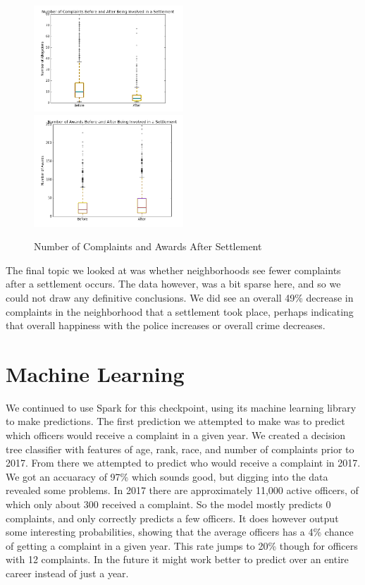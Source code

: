 \documentclass[11pt]{article}
\begin{document}
\begin{figure}[h!]
\caption{Number of Complaints and Awards After Settlement}
\includegraphics[width=0.5\textwidth]{settb.png}
\includegraphics[width=0.5\textwidth]{awards.png}
\end{figure}

The final topic we looked at was whether neighborhoods see fewer complaints after a settlement occurs. The data however, was a bit sparse here, and so we could not draw any definitive conclusions. We did see an overall 49\% decrease in complaints in the neighborhood that a settlement took place, perhaps indicating that overall happiness with the police increases or overall crime decreases.

\FloatBarrier
\section{Machine Learning}

We continued to use Spark for this checkpoint, using its machine learning library to make predictions. The first prediction we attempted to make was to predict which officers would receive a complaint in a given year. We created a decision tree classifier with features of age, rank, race, and number of complaints prior to 2017. From there we attempted to predict who would receive a complaint in 2017. We got an accuaracy of 97\% which sounds good, but digging into the data revealed some problems. In 2017 there are approximately 11,000 active officers, of which only about 300 received a complaint. So the model mostly predicts 0 complaints, and only correctly predicts a few officers. It does however output some interesting probabilities, showing that the average officers has a 4\% chance of getting a complaint in a given year. This rate jumps to 20\% though for officers with 12 complaints. In the future it might work better to predict over an entire career instead of just a year.
\end{document}
